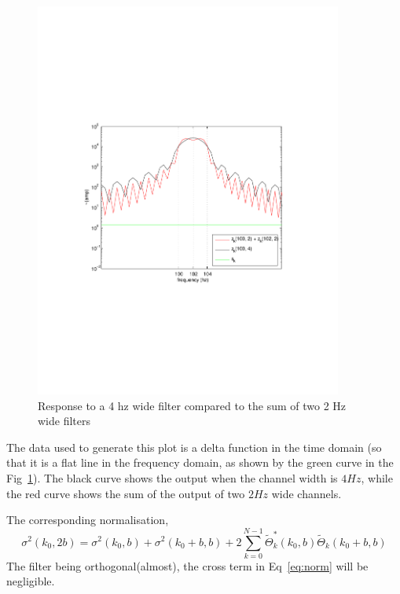 \begin{figure}
\begin{center}
\includegraphics[width=0.9\textwidth]{figures/sumoffilters}
\caption{Response to a 4 hz wide filter compared to the sum of two 2 Hz wide 
filters}
\label{fig:sumfilters}
\end{center}
\end{figure}
The data used to generate this plot is a delta function in the time domain
(so that it is a flat line in the frequency domain, as shown by the green 
curve in the Fig~\ref{fig:sumfilters}). The black curve shows the output when 
the channel width is $4 Hz$, while the red curve shows the sum of the output 
of two $2 Hz$ wide channels. 


The corresponding normalisation,  
\begin{equation}
\sigma^2(k_0,  2b) = \sigma^2(k_0,  b) + \sigma^2(k_0+b,  b) + 
2\sum_{k=0}^{N-1}\tilde{\Theta}_k^\ast(k_0,  b)\tilde{\Theta}_k(k_0 + b,  b)
\label{eq:norm}
\end{equation}
The filter being orthogonal(almost),  the cross term in Eq~\ref{eq:norm} 
will be negligible.  

